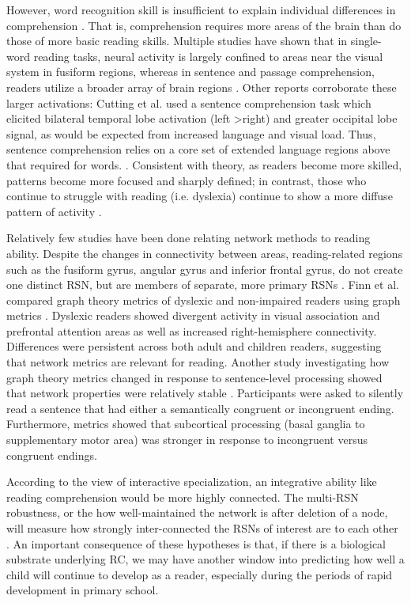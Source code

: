However, word recognition skill is insufficient to explain individual differences in comprehension \cite{Gough1986, Hoover1990}. That is, comprehension requires more areas of the brain than do those of more basic reading skills. Multiple studies have shown that in single-word reading tasks, neural activity is largely confined to areas near the visual system in fusiform regions, whereas in sentence and passage comprehension, readers utilize a broader array of brain regions \cite{Rimrodt2008,Xu2005}. Other reports corroborate these larger activations: Cutting et al. used a sentence comprehension task which elicited bilateral temporal lobe activation (left \textgreater right) and greater occipital lobe signal, as would be expected from increased language and visual load. Thus, sentence comprehension relies on a core set of extended language regions above that required for words.  \cite{Cutting2006a}. Consistent with theory, as readers become more skilled, patterns become more focused and sharply defined; in contrast, those who continue to struggle with reading (i.e. dyslexia) continue to show a more diffuse pattern of activity \cite{Rimrodt2009}. 

Relatively few studies have been done relating network methods to reading ability. Despite the changes in connectivity between areas, reading-related regions such as the fusiform gyrus, angular gyrus and inferior frontal gyrus, do not create one distinct RSN, but are members of separate, more primary RSNs \cite{Vogel2013}. Finn et al. compared graph theory metrics of dyslexic and non-impaired readers using graph metrics \cite{Finn2014}. Dyslexic readers showed divergent activity in visual association and prefrontal attention areas as well as increased right-hemisphere connectivity. Differences were persistent across both adult and children readers, suggesting that network metrics are relevant for reading. Another study investigating how graph theory metrics changed in response to sentence-level processing showed that network properties were relatively stable \cite{Ye2012}. Participants were asked to silently read a sentence that had either a semantically congruent or incongruent ending. Furthermore, metrics showed that subcortical processing (basal ganglia to supplementary motor area) was stronger in response to incongruent versus congruent endings. 

According to the view of interactive specialization, an integrative ability like reading comprehension would be more highly connected. The multi-RSN robustness, or the how well-maintained the network is after deletion of a node, will measure how strongly inter-connected the RSNs of interest are to each other \cite{Bullmore2009}. An important consequence of these hypotheses is that, if there is a biological substrate underlying RC, we may have another window into predicting how well a child will continue to develop as a reader, especially during the periods of rapid development in primary school.


